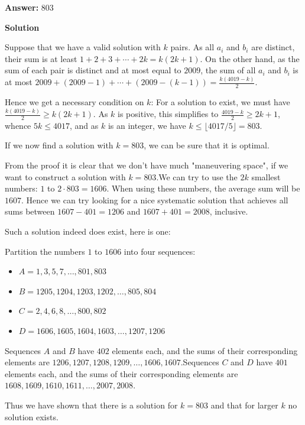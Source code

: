 \begin{enumerate}
 
 \textbf{Answer: }803



\textbf{Solution}

Suppose that we have a valid solution with $k$ pairs. As all $a_i$ and $b_i$ are distinct, their sum is at least $1+2+3+\cdots+2k=k(2k+1)$. On the other hand, as the sum of each pair is distinct and at most equal to $2009$, the sum of all $a_i$ and $b_i$ is at most $2009 + (2009-1) + \cdots + (2009-(k-1)) = \frac{k(4019-k)}{2}$.

 Hence we get a necessary condition on $k$: For a solution to exist, we must have $\frac{k(4019-k)}{2} \geq k(2k+1)$. As $k$ is positive, this simplifies to $\frac{4019-k}{2} \geq 2k+1$, whence $5k\leq 4017$, and as $k$ is an integer, we have $k\leq \lfloor 4017/5\rfloor = 803$.

 If we now find a solution with $k=803$, we can be sure that it is optimal. 

 From the proof it is clear that we don't have much "maneuvering space", if we want to construct a solution with $k=803$.We can try to use the $2k$ smallest numbers: $1$ to $2\cdot 803 = 1606$. When using these numbers, the average sum will be $1607$. Hence we can try looking for a nice systematic solution that achieves all sums between $1607-401=1206$ and $1607+401=2008$, inclusive.

 Such a solution indeed does exist, here is one:

 Partition the numbers $1$ to $1606$ into four sequences:

 
            \begin{itemize}
        \item $A=1,3,5,7,\dots,801,803$
        \item $B=1205,1204,1203,1202,\dots,805,804$
        \item $C=2,4,6,8,\dots,800,802$
        \item $D=1606,1605,1604,1603,\dots,1207,1206$
            \end{itemize}
            Sequences $A$ and $B$ have $402$ elements each, and the sums of their corresponding elements are $1206,1207,1208,1209,\dots,1606,1607$.Sequences $C$ and $D$ have $401$ elements each, and the sums of their corresponding elements are $1608,1609,1610,1611,\dots,2007,2008$.

 Thus we have shown that there is a solution for $k=\boxed{803}$ and that for larger $k$ no solution exists.

 



\end{enumerate}
